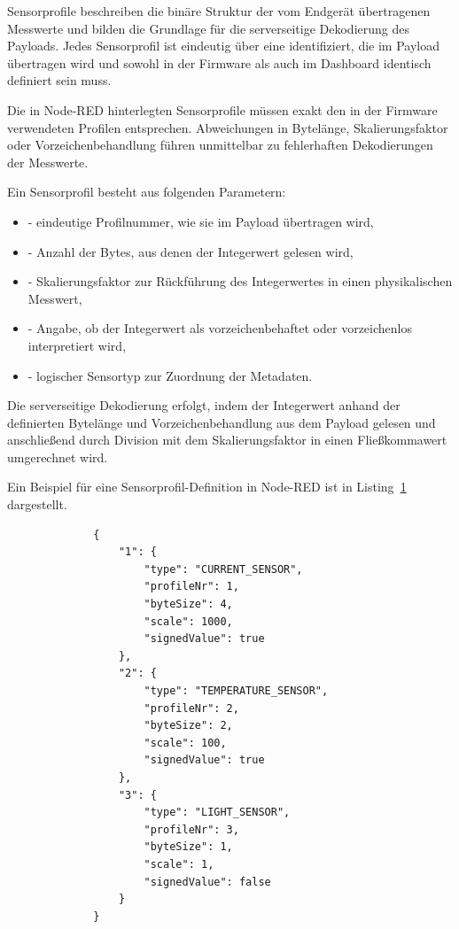 	Sensorprofile beschreiben die binäre Struktur der vom Endgerät übertragenen Messwerte und bilden die Grundlage für die serverseitige Dekodierung des Payloads. Jedes Sensorprofil ist eindeutig über eine  identifiziert, die im Payload übertragen wird und sowohl in der Firmware als auch im Dashboard identisch definiert sein muss.
	
	Die in Node-RED hinterlegten Sensorprofile müssen exakt den in der Firmware verwendeten Profilen entsprechen. Abweichungen in Bytelänge, Skalierungsfaktor oder Vorzeichenbehandlung führen unmittelbar zu fehlerhaften Dekodierungen der Messwerte.
	
	Ein Sensorprofil besteht aus folgenden Parametern:
	\begin{itemize}
		\item {} - eindeutige Profilnummer, wie sie im Payload übertragen wird,
		\item {} - Anzahl der Bytes, aus denen der Integerwert gelesen wird,
		\item {} - Skalierungsfaktor zur Rückführung des Integerwertes in einen physikalischen Messwert,
		\item {} - Angabe, ob der Integerwert als vorzeichenbehaftet oder vorzeichenlos interpretiert wird,
		\item {} - logischer Sensortyp zur Zuordnung der Metadaten.
	\end{itemize}
	
	Die serverseitige Dekodierung erfolgt, indem der Integerwert anhand der definierten Bytelänge und Vorzeichenbehandlung aus dem Payload gelesen und anschlie{\ss}end durch Division mit dem Skalierungsfaktor in einen Flie{\ss}kommawert umgerechnet wird.
	
	\medskip
	Ein Beispiel für eine Sensorprofil-Definition in Node-RED ist in Listing~\ref{lst:SensorProfilesNodeRed} dargestellt.

\begin{figure}[H]
	\label{lst:SensorProfilesNodeRed}
	\begin{verbatim}
		{
			"1": {
				"type": "CURRENT_SENSOR",
				"profileNr": 1,
				"byteSize": 4,
				"scale": 1000,
				"signedValue": true
			},
			"2": {
				"type": "TEMPERATURE_SENSOR",
				"profileNr": 2,
				"byteSize": 2,
				"scale": 100,
				"signedValue": true
			},
			"3": {
				"type": "LIGHT_SENSOR",
				"profileNr": 3,
				"byteSize": 1,
				"scale": 1,
				"signedValue": false
			}
		}
	\end{verbatim}
\end{figure}


